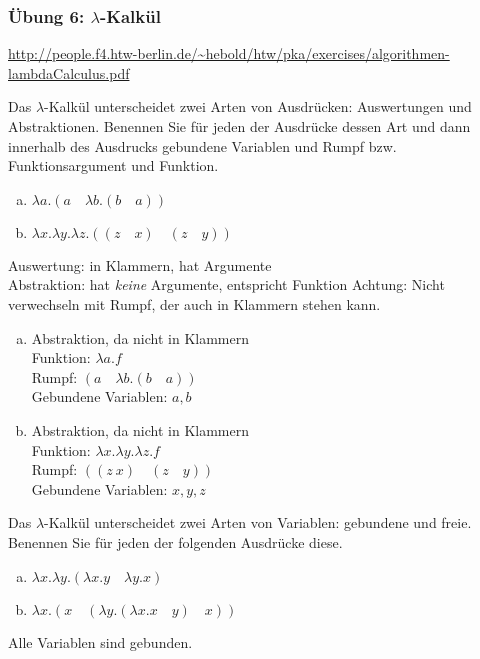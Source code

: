 \begin{card}
  \frametitle{Übung 6: $\lambda$-Kalkül}
  \url{http://people.f4.htw-berlin.de/~hebold/htw/pka/exercises/algorithmen-lambdaCalculus.pdf}
\end{card}

\begin{card}
  Das $\lambda$-Kalkül unterscheidet zwei Arten von Ausdrücken: Auswertungen und Abstraktionen. Benennen Sie für jeden der Ausdrücke dessen Art und dann innerhalb des Ausdrucks gebundene Variablen und Rumpf bzw. Funktionsargument und Funktion.
  \begin{enumerate}[a)]
    \item $\lambda a.(a \quad \lambda b.(b \quad a))$
    \item $\lambda x.\lambda y.\lambda z.((z \quad x) \quad (z \quad y))$
  \end{enumerate}
  \hr
  Auswertung: in Klammern, hat Argumente\\
  Abstraktion: hat \textit{keine} Argumente, entspricht Funktion
  Achtung: Nicht verwechseln mit Rumpf, der auch in Klammern stehen kann.
  \begin{enumerate}[a)]
    \item Abstraktion, da nicht in Klammern\\
      Funktion: $\lambda a.f$\\
      Rumpf: $(a \quad \lambda b.(b \quad a))$\\
      Gebundene Variablen: $a, b$
    \item Abstraktion, da nicht in Klammern\\
      Funktion: $\lambda x.\lambda y.\lambda z.f$ \\
      Rumpf: $((z \ x) \quad (z \quad y))$\\
      Gebundene Variablen: $x,y,z$
  \end{enumerate}
\end{card}

\begin{card}
  Das $\lambda$-Kalkül unterscheidet zwei Arten von Variablen: gebundene und freie. Benennen Sie für jeden der folgenden Ausdrücke diese.
  \begin{enumerate}[a)]
    \item $\lambda x.\lambda y.(\lambda x.y \quad \lambda y.x)$
    \item $\lambda x.(x \quad (\lambda y.(\lambda x.x \quad y) \quad x))$
  \end{enumerate}
  \hr
  Alle Variablen sind gebunden.
\end{card}

